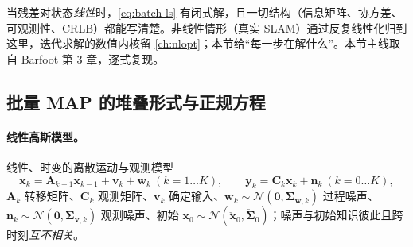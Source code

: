 当残差对状态\emph{线性}时，\cref{eq:batch-ls} 有闭式解，且一切结构（信息矩阵、协方差、可观测性、CRLB）都能写清楚。非线性情形（真实 SLAM）通过反复线性化归到这里，迭代求解的数值内核留 \cref{ch:nlopt}；本节给“每一步在解什么”。本节主线取自 Barfoot\cite{barfoot2024state} 第 3 章，逐式复现。

\subsection{批量 MAP 的堆叠形式与正规方程}
\label{sec:est-normal}

\paragraph{线性高斯模型。}
线性、时变的离散运动与观测模型\cite{barfoot2024state}
\begin{equation}
  \mathbf{x}_k=\mathbf{A}_{k-1}\mathbf{x}_{k-1}+\mathbf{v}_k+\mathbf{w}_k\ (k=1\dots K),\qquad
  \mathbf{y}_k=\mathbf{C}_k\mathbf{x}_k+\mathbf{n}_k\ (k=0\dots K),
  \label{eq:lg-models}
\end{equation}
$\mathbf{A}_k$ 转移矩阵、$\mathbf{C}_k$ 观测矩阵、$\mathbf{v}_k$ 确定输入、$\mathbf{w}_k\sim\mathcal{N}(\mathbf{0},\boldsymbol{\Sigma}_{\mathbf{w},k})$ 过程噪声、$\mathbf{n}_k\sim\mathcal{N}(\mathbf{0},\boldsymbol{\Sigma}_{\mathbf{v},k})$ 观测噪声、初始 $\mathbf{x}_0\sim\mathcal{N}(\check{\mathbf{x}}_0,\check{\boldsymbol{\Sigma}}_0)$；噪声与初始知识彼此且跨时刻\emph{互不相关}。

